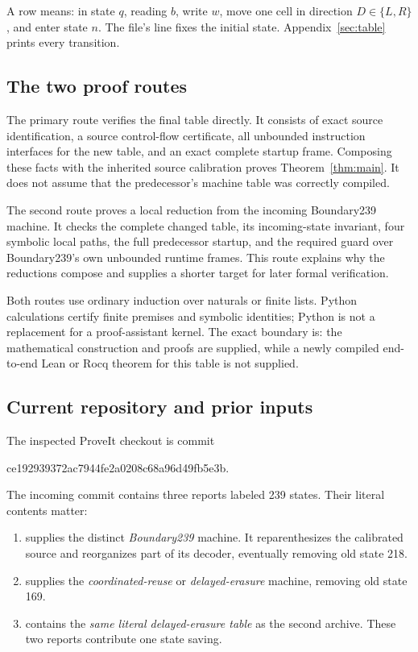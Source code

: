 A row  means: in state $q$, reading $b$, write $w$,
move one cell in direction $D\in\{L,R\}$, and enter state $n$.
The file's  line fixes the initial state.
Appendix~\ref{sec:table} prints every transition.

\subsection{The two proof routes}

The primary route verifies the final table directly. It consists of exact
source identification, a source control-flow certificate, all unbounded
instruction interfaces for the new table, and an exact complete startup
frame. Composing these facts with the inherited source calibration proves
Theorem~\ref{thm:main}. It does not assume that the predecessor's machine
table was correctly compiled.

The second route proves a local reduction from the incoming Boundary239
machine. It checks the complete changed table, its incoming-state
invariant, four symbolic local paths, the full predecessor startup, and
the required guard over Boundary239's own unbounded runtime frames.
This route explains why the reductions compose and supplies a shorter
target for later formal verification.

Both routes use ordinary induction over naturals or finite lists. Python
calculations certify finite premises and symbolic identities; Python is
not a replacement for a proof-assistant kernel. The exact boundary is:
the mathematical construction and proofs are supplied, while a newly
compiled end-to-end Lean or Rocq theorem for this table is not supplied.

\subsection{Current repository and prior inputs}

The inspected ProveIt checkout is commit
\begin{center}\small\ttfamily
ce192939372ac7944fe2a0208c68a96d49fb5e3b.
\end{center}
The incoming commit 
contains three reports labeled 239 states. Their literal contents matter:
\begin{enumerate}
\item {} supplies
the distinct \emph{Boundary239} machine. It reparenthesizes the calibrated
source and reorganizes part of its decoder, eventually removing old
state 218.
\item {} supplies the
\emph{coordinated-reuse} or \emph{delayed-erasure} machine, removing old
state 169.
\item {} contains the
\emph{same literal delayed-erasure table} as the second archive.
These two reports contribute one state saving.
\end{enumerate}

